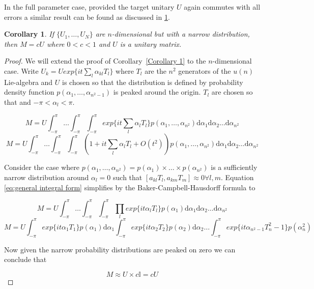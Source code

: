 \documentclass[aps,pra,twocolumn,superscriptaddress,numerical]{revtex4-1}
\newtheorem{corollary}{Corollary}
\begin{document}
In the full parameter case, provided the target unitary $U$ again commutes with all errors a similar result can be found as discussed in \ref{Corollary 2}.

\begin{corollary}
\label{Corollary 2}
	If $\{U_1,\ldots,U_N\}$ are $n$-dimensional but with a narrow distribution, then $M = c U$ where $0 < c < 1$ and $U$ is a unitary matrix.
\end{corollary}
\begin{proof}
	We will extend the proof of Corollary~\ref{Corollary 1} to the $n$-dimensional case.  Write $U_k = U exp\{i t \sum_l \alpha_{kl} T_l\}$ where $T_l$ are the $n^2$ generators of the $u(n)$ Lie-algebra and $U$ is chosen so that the distribution is defined by probability density function $p(\alpha_1,\ldots,\alpha_{n^{2}-1})$ is peaked around the origin. $T_l$ are chosen so that and $-\pi < \alpha_l < \pi$.
\begin{widetext}
	\begin{equation}
		M = U
		\int^\pi_{-\pi} \ldots \int^\pi_{-\pi} \int^\pi_{-\pi}
		exp\{i t\sum_l \alpha_{l} T_l\} p(\alpha_1,\ldots,\alpha_{n^{2}})
		\mathrm{d}\alpha_1
		\mathrm{d}\alpha_2
		\ldots
		\mathrm{d}\alpha_{n^{2}} \label{eq:general integral form}
	\end{equation}
	\begin{equation}
		M = U
		\int^\pi_{-\pi} \ldots \int^\pi_{-\pi} \int^\pi_{-\pi}
		(1 + i t\sum_l \alpha_{l} T_l + O(t^2)) p(\alpha_1,\ldots,\alpha_{n^{2}})
		\mathrm{d}\alpha_1
		\mathrm{d}\alpha_2
		\ldots
		\mathrm{d}\alpha_{n^{2}}
	\end{equation}
\end{widetext}

	Consider the case where $p(\alpha_1,\ldots,\alpha_{n^{2}}) = p(\alpha_1)\times\ldots\times p(\alpha_{n^{2}})$ is a sufficiently narrow distribution around $\alpha_{l}=0$ such that $[a_{kl}T_{l},a_{km}T_{m}]\approx0 \forall l,m$. Equation \ref{eq:general integral form} simplifies by the Baker-Campbell-Hausdorff formula to

\begin{widetext}
	\begin{equation}
		M = U
		\int^\pi_{-\pi} \ldots \int^\pi_{-\pi} \int^\pi_{-\pi}
		\prod_{l}exp\{i t\alpha_{l} T_l\}p(\alpha_1)
		\mathrm{d}\alpha_1
		\mathrm{d}\alpha_2
		\ldots
		\mathrm{d}\alpha_{n^{2}}
	\end{equation}
	\begin{equation}
		M = U
		\int^\pi_{-\pi} exp\{i t\alpha_{1} T_1\}p(\alpha_1) \mathrm{d}\alpha_1 	\int^\pi_{-\pi} exp\{i t\alpha_{2} T_2\}p(\alpha_2) \mathrm{d}\alpha_2 \ldots \int^\pi_{-\pi}
		exp\{i t\alpha_{n^{2}-1} T_n^{2}-1\}p(\alpha_n^{2})
	\end{equation}
\end{widetext}
	Now given the narrow probability distributions are peaked on zero we can conclude that

	\begin{equation}
		M \approx U\times c\mathbb{I}=cU
	\end{equation}
	
\end{proof}
\end{document}
